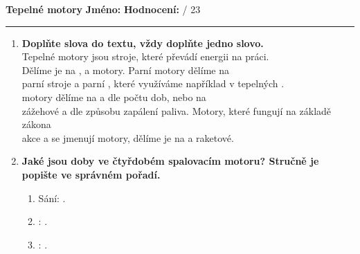 \documentclass[../main.tex]{subfiles}
\begin{document}
\pagestyle{empty}

{\Large\textbf{Tepelné motory}}
\hfill
\textbf{Jméno:}
\tecky{5cm}
\hspace{0.25cm}
\textbf{Hodnocení:}
\tecky{0.5cm}
{/}
{23}
\vspace{0.25cm}
\hrule

\begin{enumerate}[label={\textbf{\arabic*.}}]
    \item \textbf{Doplňte slova do textu, vždy doplňte jedno slovo.}\vspace{0.25cm}\\ 
    {Tepelné motory jsou stroje, které převádí \cara{3cm} energii na \cara{4cm} práci. \\
    Dělíme je na \cara{3cm}, \cara{3cm} a \cara{3cm} motory. Parní motory dělíme na \\
    parní stroje a parní \cara{3cm}, které využíváme například v tepelných \cara{3cm}.\\
    \cara{3cm} motory dělíme na \cara{3cm} a \cara{3cm} dle počtu dob, nebo na \\
    zážehové a \cara{3cm} dle způsobu zapálení paliva. Motory, které fungují na základě zákona\\
    akce a \cara{3cm} se jmenují \cara{3cm} motory, dělíme je na \cara{3cm} a raketové.}
    \vspace{-0.5cm}
    \item \textbf{Jaké jsou doby ve čtyřdobém spalovacím motoru? Stručně je popište ve správném pořadí.}
    \begin{enumerate}[label={\arabic*.}]
        \item {Sání:}\hspace{1.75cm}\tecky{14cm} .
        \item {}\tecky{2cm}:\hspace{0.5cm}\tecky{14cm} .
        \item {}\tecky{2cm}:\hspace{0.5cm}\tecky{14cm} .

\end{enumerate}
\end{enumerate}
\end{document}
